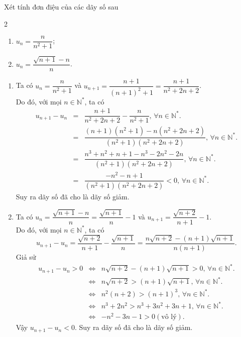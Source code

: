 \begin{vd}%
	Xét tính đơn điệu của các dãy số sau
	\begin{multicols}{2}
		\begin{enumerate}
			\item $u_n=\dfrac{n}{n^2+1}$;
			\item $u_n=\dfrac{\sqrt{n+1}-n}{n}$.
		\end{enumerate}
	\end{multicols}
	\loigiai 
	{
		\begin{enumerate}
			\item Ta có $u_n=\dfrac{n}{n^2+1}$ và $u_{n+1}=\dfrac{n+1}{(n+1)^2+1}=\dfrac{n+1}{n^2+2n+2}$.\\
			Do đó, với mọi $n\in \mathbb{N}^*$, ta có 
			\allowdisplaybreaks
			\begin{eqnarray*}
				u_{n+1}-u_n&=&\dfrac{n+1}{n^2+2n+2}-\dfrac{n}{n^2+1},\,\forall n\in \mathbb{N}^*.\\
				&=&\dfrac{(n+1)(n^2+1)-n(n^2+2n+2)}{(n^2+1)(n^2+2n+2)},\,\forall n\in \mathbb{N}^*.\\
				&=&\dfrac{n^3+n^2+n+1-n^3-2n^2-2n}{(n^2+1)(n^2+2n+2)},\,\forall n\in \mathbb{N}^*.\\
				&=&\dfrac{-n^2-n+1}{(n^2+1)(n^2+2n+2)}<0,\,\forall n\in \mathbb{N}^*.
			\end{eqnarray*}
			Suy ra dãy số đã cho là dãy số giảm.
			\item Ta có $u_n=\dfrac{\sqrt{n+1}-n}{n}=\dfrac{\sqrt{n+1}}{n}-1$ và $u_{n+1}=\dfrac{\sqrt{n+2}}{n+1}-1$.\\
			Do đó, với mọi $n\in \mathbb{N}^*$, ta có $$u_{n+1}-u_n=\dfrac{\sqrt{n+2}}{n+1}-\dfrac{\sqrt{n+1}}{n}=\dfrac{n\sqrt{n+2}-(n+1)\sqrt{n+1}}{n(n+1)}.$$
			Giả sử \allowdisplaybreaks
			\begin{eqnarray*}
				u_{n+1}-u_n>0&\Leftrightarrow&n\sqrt{n+2}-(n+1)\sqrt{n+1}>0,\,\forall n\in \mathbb{N}^*.\\
				&\Leftrightarrow&n\sqrt{n+2}>(n+1)\sqrt{n+1},\,\forall n\in \mathbb{N}^*.\\
				&\Leftrightarrow&n^2(n+2)>(n+1)^3,\,\forall n\in \mathbb{N}^*.\\
				&\Leftrightarrow&n^3+2n^2>n^3+3n^2+3n+1,\,\forall n\in \mathbb{N}^*.\\
				&\Leftrightarrow&-n^2-3n-1>0 (\text{vô lý}).
			\end{eqnarray*}
			Vậy $u_{n+1}-u_n<0$. Suy ra dãy số đã cho là dãy số giảm.
		\end{enumerate}
	}
\end{vd}

